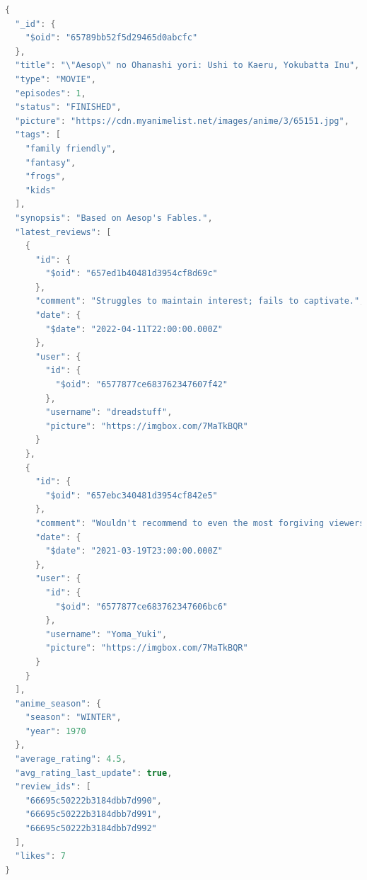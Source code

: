 \begin{mdframed}[backgroundcolor=yellow!20, innerleftmargin=10pt, innerrightmargin=10pt]
    \begin{lstlisting}[language=java]
  {
  "_id": {
    "$oid": "65789bb52f5d29465d0abcfc"
  },
  "title": "\"Aesop\" no Ohanashi yori: Ushi to Kaeru, Yokubatta Inu",
  "type": "MOVIE",
  "episodes": 1,
  "status": "FINISHED",
  "picture": "https://cdn.myanimelist.net/images/anime/3/65151.jpg",
  "tags": [
    "family friendly",
    "fantasy",
    "frogs",
    "kids"
  ],
  "synopsis": "Based on Aesop's Fables.",
  "latest_reviews": [
    {
      "id": {
        "$oid": "657ed1b40481d3954cf8d69c"
      },
      "comment": "Struggles to maintain interest; fails to captivate.",
      "date": {
        "$date": "2022-04-11T22:00:00.000Z"
      },
      "user": {
        "id": {
          "$oid": "6577877ce683762347607f42"
        },
        "username": "dreadstuff",
        "picture": "https://imgbox.com/7MaTkBQR"
      }
    },
    {
      "id": {
        "$oid": "657ebc340481d3954cf842e5"
      },
      "comment": "Wouldn't recommend to even the most forgiving viewers.",
      "date": {
        "$date": "2021-03-19T23:00:00.000Z"
      },
      "user": {
        "id": {
          "$oid": "6577877ce683762347606bc6"
        },
        "username": "Yoma_Yuki",
        "picture": "https://imgbox.com/7MaTkBQR"
      }
    }
  ],
  "anime_season": {
    "season": "WINTER",
    "year": 1970
  },
  "average_rating": 4.5,
  "avg_rating_last_update": true,
  "review_ids": [
    "66695c50222b3184dbb7d990",
    "66695c50222b3184dbb7d991",
    "66695c50222b3184dbb7d992"
  ],
  "likes": 7
}
    \end{lstlisting}
\end{mdframed}

